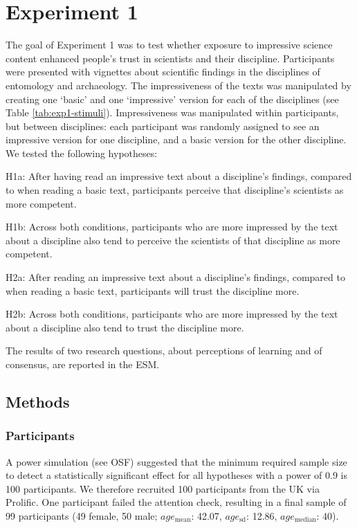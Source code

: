 \documentclass[
  english,
  doc,floatsintext]{apa6}
\begin{document}
\section{Experiment 1}\label{experiment-1}

The goal of Experiment 1 was to test whether exposure to impressive science content enhanced people's trust in scientists and their discipline. Participants were presented with vignettes about scientific findings in the disciplines of entomology and archaeology. The impressiveness of the texts was manipulated by creating one `basic' and one `impressive' version for each of the disciplines (see Table \ref{tab:exp1-stimuli}). Impressiveness was manipulated within participants, but between disciplines: each participant was randomly assigned to see an impressive version for one discipline, and a basic version for the other discipline. We tested the following hypotheses:

H1a: After having read an impressive text about a discipline's findings, compared to when reading a basic text, participants perceive that discipline's scientists as more competent.

H1b: Across both conditions, participants who are more impressed by the text about a discipline also tend to perceive the scientists of that discipline as more competent.

H2a: After reading an impressive text about a discipline's findings, compared to when reading a basic text, participants will trust the discipline more.

H2b: Across both conditions, participants who are more impressed by the text about a discipline also tend to trust the discipline more.

The results of two research questions, about perceptions of learning and of consensus, are reported in the ESM.

\subsection{Methods}\label{methods}

\subsubsection{Participants}\label{participants}

A power simulation (see OSF) suggested that the minimum required sample size to detect a statistically significant effect for all hypotheses with a power of 0.9 is 100 participants. We therefore recruited 100 participants from the UK via Prolific. One participant failed the attention check, resulting in a final sample of 99 participants (49 female, 50 male; \(age_\text{mean}\): 42.07, \(age_\text{sd}\): 12.86, \(age_\text{median}\): 40).
\end{document}
